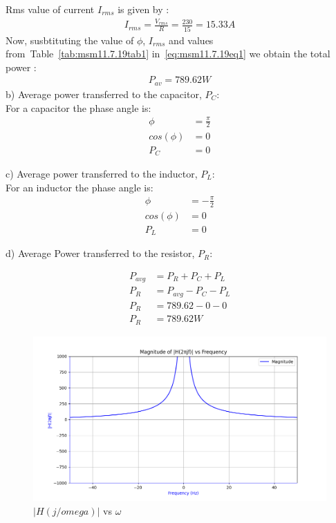 \documentclass[journal,12pt,onecolumn]{IEEEtran}
\newcommand\tabref{Table~\ref}
\theoremstyle{remark}
\providecommand{\abs}[1]{\left\vert#1\right\vert}
\begin{document}
Rms value of current $I_{rms}$ is given by  :
\begin{align}
	I_{rms}=\frac{V_{rms}}{R}=\frac{230}{15}=15.33A
\end{align}
Now, susbtituting the value of $\phi$, $I_{rms}$ and values from~\tabref{tab:msm11.7.19tab1} in~\eqref{eq:msm11.7.19eq1} we obtain the total power :
\begin{align}
	P_{av}=789.62 W
\end{align}
b) Average power transferred to the capacitor, $P_C$:\\
For a capacitor the phase angle is:
\begin{align}
	\phi &= \frac{\pi}{2}\\
	cos(\phi) &= 0\\
	P_C &= 0
\end{align}	  

c) Average power transferred to the inductor, $P_L$:\\
For an inductor the phase angle is:
\begin{align}
	\phi &= -\frac{\pi}{2}\\
	cos(\phi) &= 0\\
	P_L &= 0
\end{align}	 

d) Average Power transferred to the resistor, $P_R$:

\begin{align}
	P_{avg} &= P_{R} + P_{C} + P_{L}\\
	P_{R} &= P_{avg} - P_{C} - P_{L}\\
	P_{R} &= 789.62 -0-0\\
	P_R &= 789.62W
\end{align}

\newpage
\begin{figure}[!h]
	\centering
	\includegraphics[width=\columnwidth]{figs/rmagnitude.png}
	\caption{$\abs{H(j/omega)}$ vs $\omega$}
\end{figure}
\end{document}

